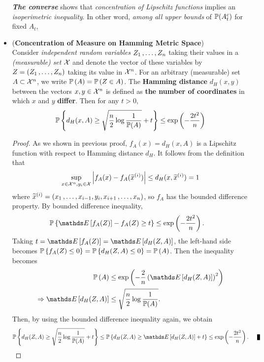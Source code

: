 \documentclass[11pt]{article}
\begin{document}
\begin{itemize}
\begin{remark}
\emph{\textbf{The converse}} shows that \emph{concentration of Lipschitz functions} implies an \emph{isoperimetric inequality}. In other word, \emph{among all upper bounds} of ${\mathbb P}(A_t^c)$ for fixed $A_t$, 
\end{remark}

\item \begin{corollary} (\textbf{Concentration of  Measure on Hamming Metric Space}) \citep{boucheron2013concentration}\\
Consider \emph{independent random variables} $Z_1 \,{,}\ldots{,}\, Z_n$ taking their values in a \emph{(measurable) set} ${\mathcal X}$ and denote the vector of these variables by $Z = (Z_1 \,{,}\ldots{,}\, Z_n)$ taking its value in ${\mathcal X}^n$.  For an arbitrary (measurable) set $A \subset {\mathcal X}^n$, we write ${\mathbb P}\left(A\right) = {\mathbb P}\left(Z \in A\right)$.  The \textbf{Hamming distance} $d_{H}(x, y)$ between the vectors $x, y \in {\mathcal X}^n$ is defined as \textbf{the number of coordinates} in which $x$ and $y$ \textbf{differ}. Then for any $t >0$, 
\begin{align}
{\mathbb P}\left\{d_{H}(x, A) \ge \sqrt{\frac{n}{2}\log \frac{1}{{\mathbb P}(A)}} + t\right\} \le \exp\left(-\frac{2t^2}{n}\right)  \label{ineqn: isoperimetry_inequality_hamming_distance}
\end{align}
\end{corollary}
\begin{proof}
As we shown in previous proof, $f_A(x) = d_{H}(x, A)$ is a Lipschitz function with respect to Hamming distance $d_H$. It follows from the definition that 
\begin{align*}
\sup_{x \in {\mathcal X}^n, y_i \in {\mathcal X}}\left\lvert f_{A}(x) - f_{A}(\widetilde{x}^{(i)}) \right\rvert \le d_{H}(x, \widetilde{x}^{(i)}) = 1
\end{align*} where $\widetilde{x}^{(i)} = (x_1 \,{,}\ldots{,}\, x_{i-1}, y_i, x_{i+1} \,{,}\ldots{,}\, x_{n})$, so $f_A$ has the bounded difference property. By bounded difference inequality, 
\begin{align*}
\bP\set{ \E{}{f_{A}(Z)} - f_{A}(Z)  \ge t }  &\le \exp\paren{-\frac{2t^2}{n}}.
\end{align*} Taking $t = \E{}{f_{A}(Z)} = \E{}{d_{H}(Z, A)}$, the left-hand side becomes ${\mathbb P}\left\{f_{A}(Z) \le 0\right\} = {\mathbb P}\left\{d_{H}(Z, A)  \le 0\right\}  = {\mathbb P}\left(A\right)$. Then the inequality becomes
\begin{align*}
\bP\paren{A} &\le \exp\paren{- \frac{2}{n} \paren{\E{}{d_{H}(Z, A)}}^2} \\
\Rightarrow \E{}{d_{H}(Z, A)} &\le \sqrt{\frac{n}{2}\log \frac{1}{\bP(A)}}.
\end{align*} Then, by using the bounded difference inequality again, we obtain
\begin{align*}
\bP\set{d_H(Z, A) \ge  \sqrt{\frac{n}{2}\log \frac{1}{\bP(A)}} + t } \le \bP\set{d_H(Z, A) \ge  \E{}{d_{H}(Z, A)} + t } \le \exp\paren{-\frac{2t^2}{n}}. \qed
\end{align*}
\end{proof}



\end{itemize}
\end{document}
